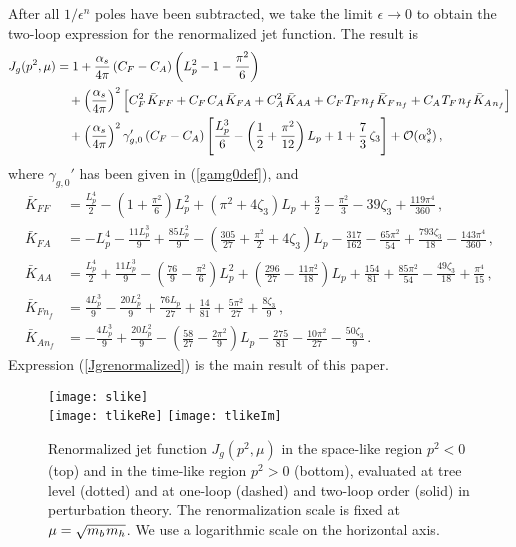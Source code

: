 \documentclass[12pt]{article}
\newcommand{\spac}{{\hspace{0.3mm}}}
\numberwithin{equation}{section}
\begin{document}
After all $1/\epsilon^n$ poles have been subtracted, we take the limit $\epsilon\to 0$ to obtain the two-loop expression for the renormalized jet function. The result is
\begin{align}\label{Jgrenormalized}
   J_g(p^2,\mu) 
   &= 1 + \frac{\alpha_s}{4\pi} \left( C_F - C_A \right) \left( L_p^2 - 1 - \frac{\pi^2}{6} \right) \notag\\
   &\quad + \left( \frac{\alpha_s}{4\pi} \right)^2 \Big[ 
    C_F^2\spac\bar K_{FF} + C_F\spac C_A\spac\bar K_{FA} + C_A^2\spac\bar K_{AA} 
    + C_F\spac T_F\spac n_f\spac\bar K_{F\spac n_f}+ C_A\spac T_F\spac n_f\spac\bar K_{A\spac n_f} \Big] \notag\\
   &\quad + \left( \frac{\alpha_s}{4\pi} \right)^2 \gamma_{g,0}'\,(C_F-C_A)
    \left[ \frac{L_p^3}{6} - \left( \frac12 + \frac{\pi^2}{12} \right) L_p + 1 + \frac73\,\zeta_3 \right] 
    + {\cal O}(\alpha_s^3) \,,   
\end{align}
where $\gamma_{g,0}'$ has been given in (\ref{gamg0def}), and
\begin{equation}
\begin{aligned}
   \bar K_{FF} &= \frac{L_p^4}{2} - \left( 1 + \frac{\pi^2}{6} \right) L_p^2
    + \left( \pi^2 + 4\zeta_3 \right) L_p
    + \frac{3}{2} - \frac{\pi^2}{3} - 39\zeta_3 +\frac{119\pi^4}{360} \,, \\
   \bar K_{FA} &= - L_p^4 - \frac{11 L_p^3}{9} + \frac{85 L_p^2}{9} 
    - \left( \frac{305}{27} + \frac{\pi^2}{2} + 4\zeta_3 \right) L_p
    - \frac{317}{162} - \frac{65\pi^2}{54} + \frac{793\zeta_3}{18} - \frac{143\pi^4}{360} \,,  \\
   \bar K_{AA} &= \frac{L_p^4}{2} + \frac{11 L_p^3}{9} - \left( \frac{76}{9} - \frac{\pi^2}{6} \right) L_p^2
    + \left( \frac{296}{27} - \frac{11\pi^2}{18} \right) L_p
    + \frac{154}{81} + \frac{85\pi^2}{54} - \frac{49\zeta_3}{18} + \frac{\pi^4}{15} \,,  \\
   \bar K_{Fn_f} &= \frac{4 L_p^3}{9} - \frac{20 L_p^2}{9} + \frac{76 L_p}{27} + \frac{14}{81}
    + \frac{5\pi^2}{27} + \frac{8\zeta_3}{9} \,,  \\
   \bar K_{An_f} &= - \frac{4 L_p^3}{9} + \frac{20 L_p^2}{9} 
    - \left( \frac{58}{27} - \frac{2\pi^2}{9} \right) L_p 
    - \frac{275}{81} - \frac{10\pi^2}{27} - \frac{50\zeta_3}{9} \,.
\end{aligned}
\end{equation}
Expression (\ref{Jgrenormalized}) is the main result of this paper. 

\begin{figure}[t]
\begin{center}
\texttt{[image: slike]} \\
\texttt{[image: tlikeRe]} \quad
\texttt{[image: tlikeIm]}
\caption{\label{fig:Jrenfig} 
Renormalized jet function $J_g(p^2,\mu)$ in the space-like region $p^2<0$ (top) and in the time-like region $p^2>0$ (bottom), evaluated at tree level (dotted) and at one-loop (dashed) and two-loop order (solid) in perturbation theory. The renormalization scale is fixed at $\mu=\sqrt{m_b\spac m_h}$. We use a logarithmic scale on the horizontal axis.}
\end{center}
\end{figure}
\end{document}
